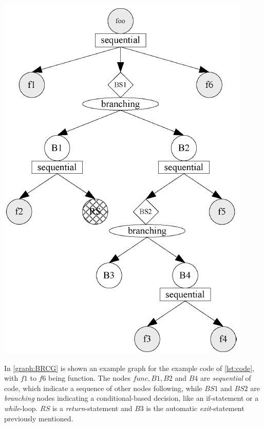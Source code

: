 \begin{minipage}{.55\textwidth}
	\vspace{-5em}
	\includegraphics[width=.75\textwidth]{src/pic/BRCG-example.png}
	\label{graph:BRCG}
	\vspace{2em}
\end{minipage}
In \autoref{graph:BRCG} is shown an example graph for the example code of \autoref{lst:code}, with $f1$ to $f6$ being function. The nodes $func, B1, B2$ and $B4$ are \textit{sequential} of code, which indicate a sequence of other nodes following, while $BS1$ and $BS2$ are \textit{branching} nodes indicating a conditional-based decision, like an if-statement or a \textit{while}-loop. $RS$ is a \textit{return}-statement and $B3$ is the automatic \textit{exit}-statement previously mentioned.\newline
